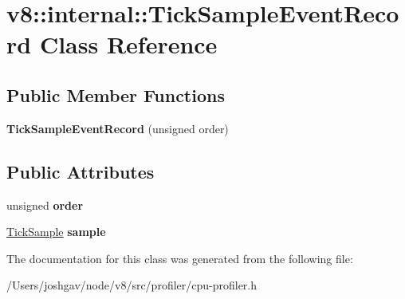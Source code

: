 \hypertarget{classv8_1_1internal_1_1_tick_sample_event_record}{}\section{v8\+:\+:internal\+:\+:Tick\+Sample\+Event\+Record Class Reference}
\label{classv8_1_1internal_1_1_tick_sample_event_record}
\subsection*{Public Member Functions}
\begin{DoxyCompactItemize}
\item 
{\bfseries Tick\+Sample\+Event\+Record} (unsigned order)\hypertarget{classv8_1_1internal_1_1_tick_sample_event_record_aded34e816837806ba11c170fa55bb5fe}{}\label{classv8_1_1internal_1_1_tick_sample_event_record_aded34e816837806ba11c170fa55bb5fe}

\end{DoxyCompactItemize}
\subsection*{Public Attributes}
\begin{DoxyCompactItemize}
\item 
unsigned {\bfseries order}\hypertarget{classv8_1_1internal_1_1_tick_sample_event_record_a136c35b8cd9e65607f18a8a269180058}{}\label{classv8_1_1internal_1_1_tick_sample_event_record_a136c35b8cd9e65607f18a8a269180058}

\item 
\hyperlink{structv8_1_1internal_1_1_tick_sample}{Tick\+Sample} {\bfseries sample}\hypertarget{classv8_1_1internal_1_1_tick_sample_event_record_a69f640310e3dcca5a503a0a5b71f1d27}{}\label{classv8_1_1internal_1_1_tick_sample_event_record_a69f640310e3dcca5a503a0a5b71f1d27}

\end{DoxyCompactItemize}


The documentation for this class was generated from the following file\+:\begin{DoxyCompactItemize}
\item 
/\+Users/joshgav/node/v8/src/profiler/cpu-\/profiler.\+h\end{DoxyCompactItemize}
